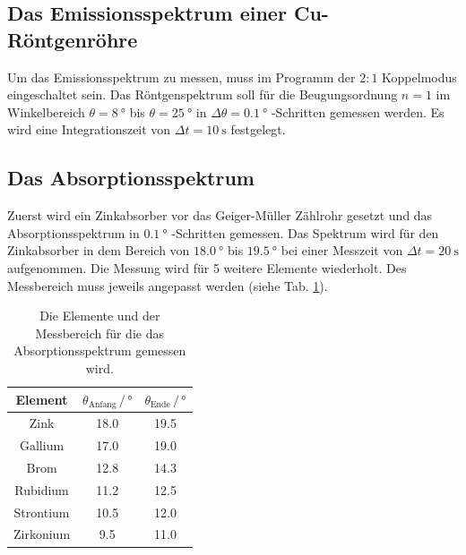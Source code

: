 \subsection{Das Emissionsspektrum einer Cu-Röntgenröhre}
Um das Emissionsspektrum zu messen, muss im Programm der $2:1$ Koppelmodus eingeschaltet sein.
Das Röntgenspektrum soll für die Beugungsordnung $n=1$ im Winkelbereich $\theta = \SI{8}{\degree}$ bis $\theta = \SI{25}{\degree}$ in $\Delta \theta = \SI{0.1}{\degree}$ -Schritten gemessen werden.
Es wird eine Integrationszeit von $\Delta t = \SI{10}{\second}$ festgelegt.

\subsection{Das Absorptionsspektrum}
Zuerst wird ein Zinkabsorber vor das Geiger-Müller Zählrohr gesetzt und das Absorptionsspektrum in $\SI{0.1}{\degree}$ -Schritten gemessen.
Das Spektrum wird für den Zinkabsorber in dem Bereich von $\SI{18.0}{\degree}$ bis $\SI{19.5}{\degree}$ bei einer Messzeit von $\Delta t = \SI{20}{\second}$ aufgenommen.
Die Messung wird für 5 weitere Elemente wiederholt.
Des Messbereich muss jeweils angepasst werden (siehe Tab. \ref{tab:messzeit}).
\begin{table}
    \centering
    \begin{tabular}{c|cc}
    \toprule
    Element & $\theta_\text{Anfang} \,/\, \si{\degree}$ & $\theta_\text{Ende} \,/\, \si{\degree}$ \\
    \midrule
    Zink & 18.0 & 19.5 \\
    Gallium & 17.0 & 19.0 \\
    Brom & 12.8 & 14.3 \\
    Rubidium & 11.2 & 12.5 \\
    Strontium & 10.5 & 12.0 \\
    Zirkonium & 9.5 & 11.0 \\
    \bottomrule
    \end{tabular}
    \caption{Die Elemente und der Messbereich für die das Absorptionsspektrum gemessen wird.}
    \label{tab:messzeit}
\end{table}